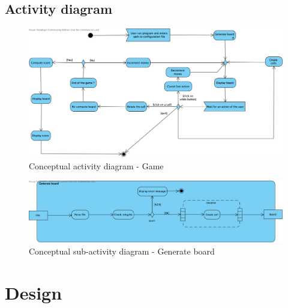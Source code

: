\documentclass[a4paper,11pt]{article}
\begin{document}
\subsection{Activity diagram}
\begin{figure}[h]
	\center
	\includegraphics[angle=90,scale=0.9]{Conceptual-activity-diagram.png}
	\caption{Conceptual activity diagram - Game}
	\label{fig:concept-activity}
\end{figure}

\begin{figure}[h]
	\center
	\includegraphics[angle=90,scale=0.7]{Generate-board.png}
	\caption{Conceptual sub-activity diagram - Generate board}
	\label{fig:concept-generate-board}
\end{figure}

\section{Design}
\end{document}
